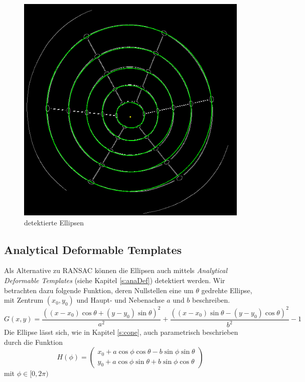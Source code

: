 \begin{figure}[!htb]
	\centering
	\includegraphics[scale=.25]{images/detectedEllipses.png}
	\caption{detektierte Ellipsen}
	\label{fig:detectedEllipses}
\end{figure}


\subsection{Analytical Deformable Templates}

Als Alternative zu RANSAC können die Ellipsen auch mittels \textit{Analytical Deformable Templates} (siehe Kapitel \ref{s:anaDef}) detektiert werden. Wir betrachten dazu folgende Funktion, deren Nullstellen eine um $\theta$ gedrehte Ellipse, mit Zentrum $(x_0,y_0)$ und Haupt- und Nebenachse $a$ und $b$ beschreiben.
\[
	G(x,y) = \frac{((x - x_0)\cos\theta + (y - y_0)\sin\theta)^2}{a^2} + \frac{((x - x_0)\sin\theta - (y - y_0)\cos\theta)^2}{b^2} - 1
\] %
Die Ellipse lässt sich, wie in Kapitel \ref{s:cone}, auch parametrisch beschrieben durch die Funktion
\[
H(\phi) = \begin{pmatrix}x_0 + a\cos\phi\cos\theta - b\sin\phi\sin\theta \\
y_0 + a\cos\phi\sin\theta + b\sin\phi\cos\theta\end{pmatrix}
\] %
mit $\phi \in [0,2\pi)$

